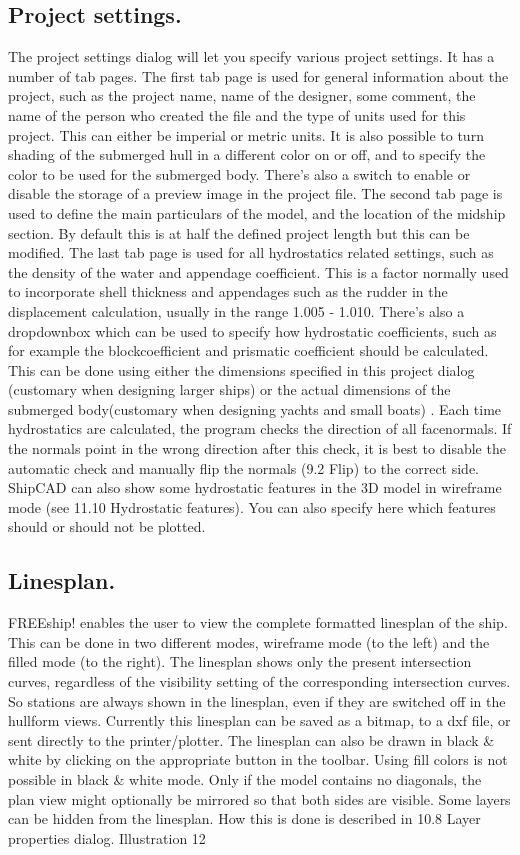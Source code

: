 \documentclass[12pt]{article}
\begin{document}
\subsection{Project settings.}
The project settings dialog will let you specify various project settings. It has a number of tab pages.
The first tab page is used for general information about the
project, such as the project name, name of the designer, some
comment, the name of the person who created the file and the
type of units used for this project. This can either be imperial or
metric units.
It is also possible to turn shading of the submerged hull in a
different color on or off, and to specify the color to be used for the
submerged body.
There's also a switch to enable or disable the storage of a
preview image in the project file.
The second tab page is used to define the main particulars of the
model, and the location of the midship section. By default this is
at half the defined project length but this can be modified.
The last tab page is used for all hydrostatics related settings,
such as the density of the water and appendage coefficient. This
is a factor normally used to incorporate shell thickness and
appendages such as the rudder in the displacement calculation,
usually in the range 1.005 - 1.010. There's also a dropdownbox
which can be used to specify how hydrostatic coefficients, such
as for example the blockcoefficient and prismatic coefficient
should be calculated. This can be done using either the
dimensions specified in this project dialog (customary when
designing larger ships) or the actual dimensions of the
submerged body(customary when designing yachts and small
boats) .
Each time hydrostatics are calculated, the program checks the direction of all facenormals. If the
normals point in the wrong direction after this check, it is best to disable the automatic check and
manually flip the normals (9.2 Flip) to the correct side.
ShipCAD can also show some hydrostatic features in the 3D model in wireframe mode (see 11.10
Hydrostatic features). You can also specify here which features should or should not be plotted.

\subsection{Linesplan.}
FREEship! enables the user to view the complete formatted linesplan of the ship. This can be done
in two different modes, wireframe mode (to the left) and the filled mode (to the right). The linesplan
shows only the present intersection curves, regardless of the visibility setting of the corresponding
intersection curves. So stations are always shown in the linesplan, even if they are switched off in
the hullform views. Currently this linesplan can be saved as a bitmap, to a dxf file, or sent directly to
the printer/plotter. The linesplan can also be drawn in black \& white by clicking on the appropriate
button in the toolbar. Using fill colors is not possible in black \& white mode. Only if the model
contains no diagonals, the plan view might optionally be mirrored so that both sides are visible.
Some layers can be
hidden from the
linesplan. How this is
done is described in
10.8 Layer properties
dialog.
Illustration 12
\end{document}
